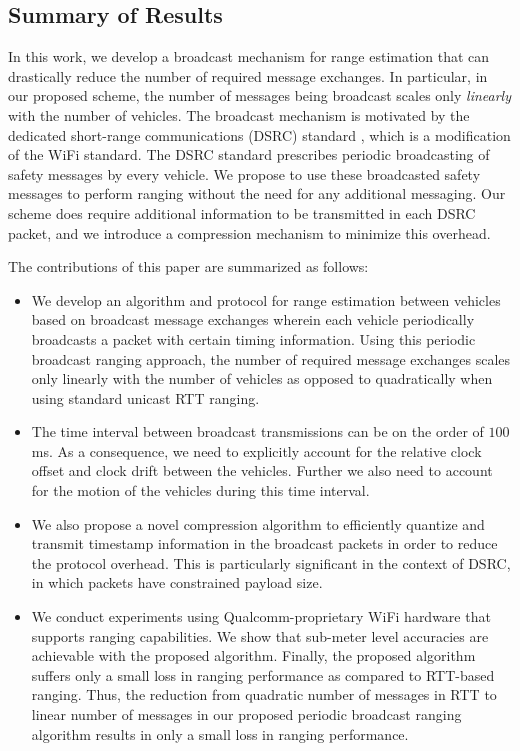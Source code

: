 \documentclass[12pt,journal,final,onecolumn]{IEEEtran}
\theoremstyle{definition}
\theoremstyle{myremark}
\begin{document}
\subsection{Summary of Results}
\label{sec:intro_summary}

In this work, we develop a broadcast mechanism for range estimation that can
drastically reduce the number of required message exchanges. In particular, in
our proposed scheme, the number of messages being broadcast scales only
\emph{linearly} with the number of vehicles. The broadcast mechanism is motivated
by the dedicated short-range communications (DSRC) standard \cite{dsrc}, which
is a modification of the WiFi standard. The DSRC standard prescribes periodic
broadcasting of safety messages by every vehicle. We propose to use these
broadcasted safety messages to perform ranging without the need for any
additional messaging. Our scheme does require additional information to be
transmitted in each DSRC packet, and we introduce a compression mechanism to
minimize this overhead. 

The contributions of this paper are summarized as follows:

\begin{itemize}
    \item We develop an algorithm and protocol for range estimation between
        vehicles based on broadcast message exchanges wherein each vehicle
        periodically broadcasts a packet with certain timing information. Using
        this periodic broadcast ranging approach, the number of required message
        exchanges scales only linearly with the number of vehicles as opposed to
        quadratically when using standard unicast RTT ranging.
    \item The time interval between broadcast transmissions can be on the order of
        $100$ ms.  As a consequence, we need to explicitly account for the
        relative clock offset and clock drift between the vehicles. Further we
        also need to account for the motion of the vehicles during this time
        interval.
    \item We also propose a novel compression algorithm to efficiently quantize
        and transmit timestamp information in the broadcast packets in order to
        reduce the protocol overhead. This is particularly significant in the
        context of DSRC, in which packets have constrained payload size.
    \item We conduct experiments using Qualcomm-proprietary WiFi hardware that
        supports ranging capabilities. We show that sub-meter level accuracies
        are achievable with the proposed algorithm. Finally, the proposed
        algorithm suffers only a small loss in ranging performance
        as compared to RTT-based ranging. Thus, the reduction from quadratic
        number of messages in RTT to linear number of messages in our proposed
        periodic broadcast ranging algorithm results in only a small loss in
        ranging performance.
\end{itemize}
\end{document}
